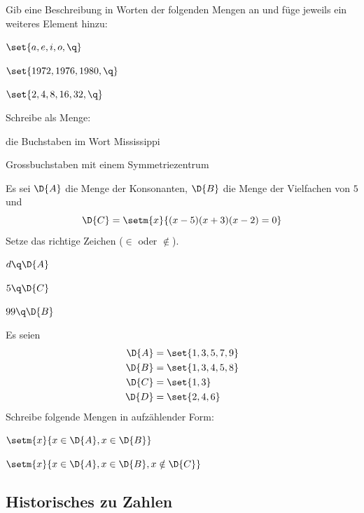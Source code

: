 \documentclass[%
11pt,%
twoside,%
titlepage,%
german,%
]{scrartcl}
\begin{document}
\begin{ueb}[in Worten]
Gib eine Beschreibung in Worten der folgenden Mengen an und f\"uge jeweils ein weiteres Element hinzu:
\begin{enumeratea}
\item $\set{a,e,i,o,\q}$
\item $\set{1972,1976,1980,\q}$
\item $\set{2,4,8,16,32,\q}$
\end{enumeratea}
\end{ueb}

\begin{ueb}[Mississippi]
Schreibe als Menge:
\begin{enumeratea}
\item die Buchstaben im Wort Mississippi
\item Grossbuchstaben mit einem Symmetriezentrum
\end{enumeratea}
\end{ueb}

\begin{ueb}
Es sei $\D{A}$ die Menge der Konsonanten, $\D{B}$ die Menge der Vielfachen von $5$ und
$$\D{C}=\setm{x}{(x-5)(x+3)(x-2)=0}$$
Setze das richtige Zeichen ($\in$ oder $\notin$).
\begin{enumeratea}
\item $d\q\D{A}$
\item $5\q\D{C}$
\item $99\q\D{B}$
\end{enumeratea}
\end{ueb}

\begin{ueb}
Es seien
\begin{align*}
\D{A}&=\set{1,3,5,7,9}\\
\D{B}&=\set{1,3,4,5,8}\\
\D{C}&=\set{1,3}\\
\D{D}&=\set{2,4,6}\\
\end{align*}
Schreibe folgende Mengen in aufz\"ahlender Form:
\begin{enumeratea}
\item $\setm{x}{x\in\D{A}, x\in\D{B}}$
\item $\setm{x}{x\in\D{A},x\in\D{B},x\notin\D{C}}$
\end{enumeratea}
\end{ueb}

\subsection{Historisches zu Zahlen}
\end{document}
